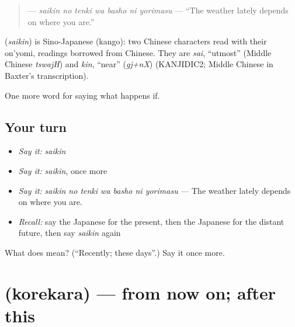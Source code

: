 \begin{quote}
\textbf{   } — \emph{saikin no tenki wa basho ni yorimasu} — \textquotedblleft{}The weather lately depends on where you are.\textquotedblright{}
\end{quote}

\begin{cousinweb}
\textbf{} (\emph{saikin}) is Sino-Japanese (kango): two Chinese characters read with their on'yomi, readings borrowed from Chinese. They are \emph{sai}, \textquotedblleft{}utmost\textquotedblright{} (Middle Chinese \emph{tswajH}) and \emph{kin}, \textquotedblleft{}near\textquotedblright{} (\emph{gj+nX}) (KANJIDIC2; Middle Chinese in Baxter's transcription).
\end{cousinweb}

\begin{grammarlens}[title={What you've built}]
One more word for saying what happens if.
\end{grammarlens}

\subsection*{Your turn}
\begin{itemize}
\raggedright
  \item \emph{Say it:} \emph{saikin}
  \item \emph{Say it:} \emph{saikin}, once more
  \item \emph{Say it:} \emph{saikin no tenki wa basho ni yorimasu} — The weather lately depends on where you are.
  \item \emph{Recall:} say the Japanese for the present, then the Japanese for the distant future, then say \emph{saikin} again
\end{itemize}

\begin{tcolorbox}[breakable,colback=teal!4,colframe=teal!35!black,title={Before you move on}]
What does  mean? (\textquotedblleft{}Recently; these days\textquotedblright{}.) Say it once more.
\end{tcolorbox}
\section[\texorpdfstring{\ja{これから} (korekara)}{これから (korekara)}]{ (korekara) — from now on; after this}

\label{lesson:JA-C527-korekara}



